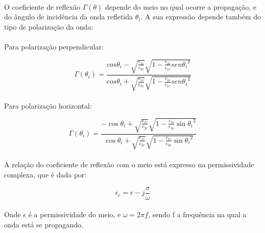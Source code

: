 \paragraph{} O coeficiente de reflexão $\Gamma(\theta)$ depende do meio no qual ocorre a propagação, e do ângulo de incidência da onda refletida $\theta_i$. A sua expressão depende também do tipo de polarização da onda:



\paragraph{}Para polarização perpendicular:

\begin{equation}
    \Gamma(\theta_i) = \frac{cos\theta_i - \sqrt{\frac{\epsilon_{1c}}{\epsilon_{2c}}}\sqrt{1 - \frac{\epsilon_{2c}}{\epsilon_{1c}}{sen\theta_i}^2}}{cos\theta_i + \sqrt{\frac{\epsilon_{1c}}{\epsilon_{2c}}}\sqrt{1 - \frac{\epsilon_{2c}}{\epsilon_{1c}}{sen\theta_i}^2}}
\end{equation}



\paragraph{}Para polarização horizontal:

\begin{equation}
    \Gamma(\theta_i) = \frac{-\cos\theta_i + \sqrt{\frac{\epsilon_{1c}}{\epsilon_{2c}}}\sqrt{1 - \frac{\epsilon_{1c}}{\epsilon_{2c}}{\sin\theta_i}^2}}{\cos\theta_i + \sqrt{\frac{\epsilon_{1c}}{\epsilon_{2c}}}\sqrt{1 - \frac{\epsilon_{1c}}{\epsilon_{2c}}{\sin\theta_i}^2}}
\end{equation}


\paragraph{}A relação do coeficiente de reflexão com o meio está expresso na permissividade complexa, que é dada por:

\begin{equation}
    \epsilon_c = \epsilon - j\frac{\sigma}{\omega}
\end{equation}

\paragraph{}Onde $\epsilon$ é a permissividade do meio, e $\omega = 2\pi f$, sendo f a frequência na qual a onda está se propagando.

